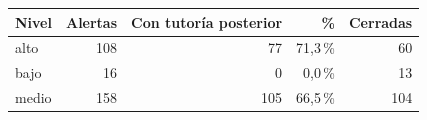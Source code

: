 \begin{tabular}{lrrrr}
\toprule
Nivel & Alertas & Con tutoría posterior & \% & Cerradas \\
\midrule
alto & 108 & 77 & 71,3\,\% & 60 \\
bajo & 16 & 0 & 0,0\,\% & 13 \\
medio & 158 & 105 & 66,5\,\% & 104 \\
\bottomrule
\end{tabular}
